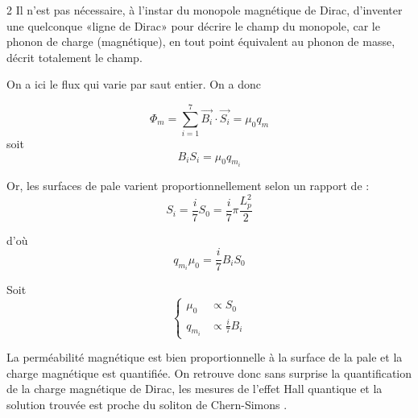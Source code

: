 \begin{multicols}{2}
Il n'est pas nécessaire, à l'instar du monopole magnétique de Dirac, d'inventer une quelconque «ligne de Dirac» pour décrire le champ du monopole, car le phonon de charge (magnétique), en tout point équivalent au phonon de masse, décrit totalement le champ.

On a ici le flux qui varie par saut entier. On a donc

\begin{equation*}
	\Phi_m = \sum_{i=1}^{7} \vec{B_i} \cdot \vec{S_i} = \mu_0 q_m
\end{equation*}
soit
\begin{equation*}
	B_i S_i = \mu_0 q_{m_i}
\end{equation*}

Or, les surfaces de pale varient proportionnellement selon un rapport de :
\begin{equation*}
	S_i = \frac{i}{7} S_0 = \frac{i}{7} \pi \frac{L_p^2}{2}
\end{equation*}

d'où
\begin{equation*}
	q_{m_i} \mu_0 = \frac{i}{7} B_i S_0
\end{equation*}

Soit
\begin{equation*}
	\left\{
	\begin{split}
		\mu_0  &\propto S_0  \\ 
		q_{m_i}&\propto \frac{i}{7} B_i 
	\end{split}
	\right.
\end{equation*}

La perméabilité magnétique est bien proportionnelle à la surface de la pale et la charge magnétique est quantifiée. On retrouve donc sans surprise la quantification de la charge magnétique de Dirac, les mesures de l'effet Hall quantique \cite{klitzing1980new} et la solution trouvée est proche du soliton de Chern-Simons \cite{jackiw1990solitons}.


\end{multicols}
